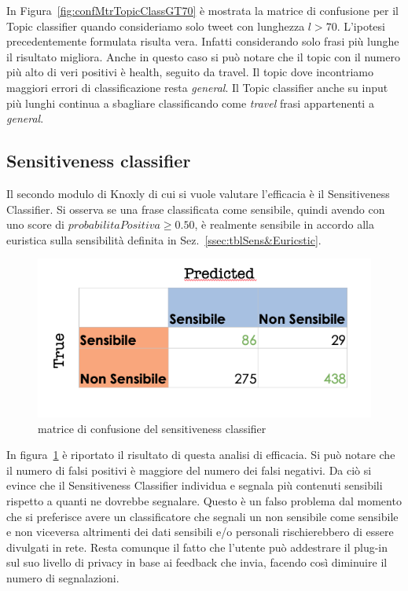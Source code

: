 In Figura~\ref{fig:confMtrTopicClassGT70} è mostrata la matrice di confusione per il Topic classifier quando consideriamo solo tweet con lunghezza $l > 70$. L'ipotesi precedentemente formulata risulta vera. Infatti considerando solo frasi più lunghe il risultato migliora. Anche in questo caso si può notare che il topic con il numero più alto di veri positivi è health, seguito da travel. Il topic dove incontriamo maggiori errori di classificazione resta \textit{general}. Il Topic classifier anche su input più lunghi continua a sbagliare classificando come \textit{travel} frasi appartenenti a \textit{general}.

\subsection{Sensitiveness classifier}
\label{sec:qualSens}
Il secondo modulo di Knoxly di cui si vuole valutare l'efficacia è il Sensitiveness Classifier. Si osserva se una frase classificata come sensibile, quindi avendo con uno score di $probabilitaPositiva \geq 0.50$, è realmente sensibile in accordo alla euristica sulla sensibilità definita in Sez.~\ref{ssec:tblSens&Euricstic}. 

\begin{figure}[h!t]
    \centering
    \includegraphics[width=15cm]{Figure/qualitativa/qualSens.png}
    \caption{matrice di confusione del sensitiveness classifier}
    \label{fig:sensitivenessevaluation}
\end{figure}
\FloatBarrier

In figura~\ref{fig:sensitivenessevaluation} è riportato il risultato di questa analisi di efficacia. Si può notare che il numero di falsi positivi è maggiore del numero dei falsi negativi. Da ciò si evince che il Sensitiveness Classifier individua e segnala più contenuti sensibili rispetto a quanti ne dovrebbe segnalare. Questo è un falso problema dal momento che si preferisce avere un classificatore che segnali un non sensibile come sensibile e non viceversa altrimenti dei dati sensibili e/o personali rischierebbero di essere divulgati in rete. Resta comunque il fatto che l'utente può addestrare il plug-in sul suo livello di privacy in base ai feedback che invia, facendo così diminuire il numero di segnalazioni.


